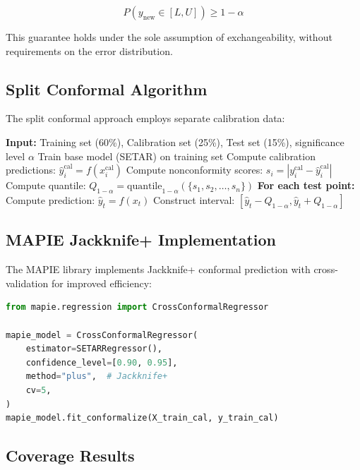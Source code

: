 \documentclass[12pt]{report}
\begin{document}
\begin{equation}
P(y_{\text{new}} \in [L, U]) \geq 1 - \alpha
\end{equation}

This guarantee holds under the sole assumption of exchangeability, without requirements on the error distribution.

\subsection{Split Conformal Algorithm}

The split conformal approach employs separate calibration data:

\begin{algorithm}[H]
\caption{Split Conformal Prediction}
\begin{algorithmic}[1]
\State \textbf{Input:} Training set (60\%), Calibration set (25\%), Test set (15\%), significance level $\alpha$
\State Train base model (SETAR) on training set
\State Compute calibration predictions: $\hat{y}_i^{\text{cal}} = f(x_i^{\text{cal}})$
\State Compute nonconformity scores: $s_i = |y_i^{\text{cal}} - \hat{y}_i^{\text{cal}}|$
\State Compute quantile: $Q_{1-\alpha} = \text{quantile}_{1-\alpha}(\{s_1, s_2, \ldots, s_n\})$
\State \textbf{For each test point:}
\State \quad Compute prediction: $\hat{y}_t = f(x_t)$
\State \quad Construct interval: $[\hat{y}_t - Q_{1-\alpha}, \hat{y}_t + Q_{1-\alpha}]$
\end{algorithmic}
\end{algorithm}

\subsection{MAPIE Jackknife+ Implementation}

The MAPIE library implements Jackknife+ conformal prediction with cross-validation for improved efficiency:

\begin{lstlisting}[language=Python, caption={MAPIE Implementation}]
from mapie.regression import CrossConformalRegressor

mapie_model = CrossConformalRegressor(
    estimator=SETARRegressor(),
    confidence_level=[0.90, 0.95],
    method="plus",  # Jackknife+
    cv=5,
)
mapie_model.fit_conformalize(X_train_cal, y_train_cal)
\end{lstlisting}

\subsection{Coverage Results}
\end{document}
